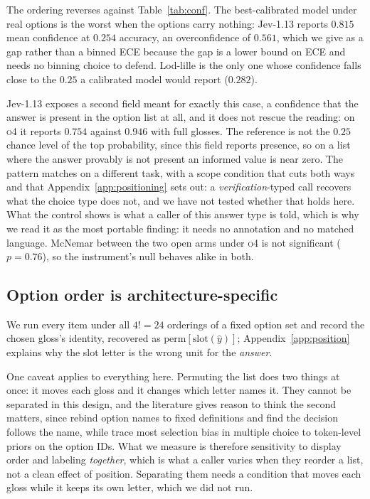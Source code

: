 \documentclass[11pt]{article}
\begin{document}
The ordering reverses against Table~\ref{tab:conf}. The best-calibrated model
under real options is the worst when the options carry nothing: Jev-1.13 reports
$0.815$ mean confidence at $0.254$ accuracy, an overconfidence of $0.561$, which
we give as a gap rather than a binned ECE because the gap is a lower bound on ECE
and needs no binning choice to defend. Lod-lille is the only one whose confidence
falls close to the $0.25$ a calibrated model would report ($0.282$).

Jev-1.13 exposes a second field meant for exactly this case, a confidence that the
answer is present in the option list at all, and it does not rescue the reading:
on \textsc{o4} it reports $0.754$ against $0.946$ with full glosses. The reference
is not the $0.25$ chance level of the top probability, since this field reports
presence, so on a list where the answer provably is not present an informed value
is near zero. The pattern matches \citet{zhong2026rejection} on a different task,
with a scope condition that cuts both ways and that
Appendix~\ref{app:positioning} sets out: a \emph{verification}-typed call recovers
what the choice type does not, and we have not tested whether that holds here.
What the control shows is what a caller of this answer type is told, which is why
we read it as the most portable finding: it needs no annotation and no matched
language. McNemar between the two
open arms under \textsc{o4} is not significant ($p = 0.76$), so the instrument's
null behaves alike in both.

\subsection{Option order is architecture-specific}
\label{sec:order}

We run every item under all $4! = 24$ orderings of a fixed option set and record
the chosen gloss's identity, recovered as
$\mathrm{perm}[\mathrm{slot}(\hat{y})]$; Appendix~\ref{app:position} explains why
the slot letter is the wrong unit for the \emph{answer}.

One caveat applies to everything here. Permuting
the list does two things at once: it moves each gloss and it changes which letter
names it. They cannot be separated in this design, and the literature gives reason
to think the second matters, since \citet{sun2026typesafe} rebind option names to
fixed definitions and find the decision follows the name, while
\citet{zheng2024robust} trace most selection bias in multiple choice to token-level
priors on the option IDs. What we measure is therefore sensitivity to display order
and labeling \emph{together}, which is what a caller varies when they reorder a
list, not a clean effect of position. Separating them needs a condition that moves
each gloss while it keeps its own letter, which we did not run.
\end{document}
